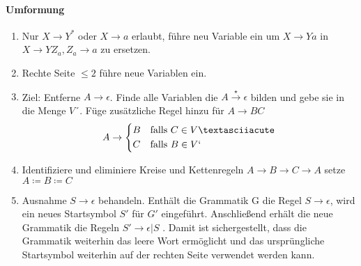 \documentclass[a4paper]{scrartcl}
\begin{document}
		\paragraph{Umformung}
		\begin{enumerate}
			\item Nur \( X \to Y^* \) oder \( X \to a \) erlaubt, führe neu Variable ein um \( X \to Ya \) in \( X \to Y Z_a, Z_a \to a \) zu ersetzen.
			\item  Rechte Seite \( \leq 2 \) führe neue Variablen ein.
			\item Ziel: Entferne \( A \to \epsilon \). Finde alle Variablen die \( A \overset{\star}{\to} \epsilon \) bilden und gebe sie in die Menge \( V´\). Füge zusätzliche Regel hinzu für \( A \to BC \) 
			\[
				A \to 
				\begin{dcases*}
					B & falls \( C \in V´ \)\\
					C & falls \( B \in V` \)
				\end{dcases*}
			\]
			\item Identifiziere und eliminiere Kreise und Kettenregeln \( A \to B \to C \to A \) setze \( A \coloneqq B \coloneqq C\)
			\item Ausnahme \(S \to \epsilon \)  behandeln. Enthält die Grammatik G die Regel \(S \to \epsilon \), wird ein neues Startsymbol \(S′\) für \(G'\) eingeführt. Anschließend erhält die neue Grammatik die Regeln \(S′ \to \epsilon | S \) . Damit ist sichergestellt, dass die Grammatik weiterhin das leere Wort ermöglicht und das ursprüngliche Startsymbol weiterhin auf der rechten Seite verwendet werden kann.
		\end{enumerate}
	
	
	
\end{document}
